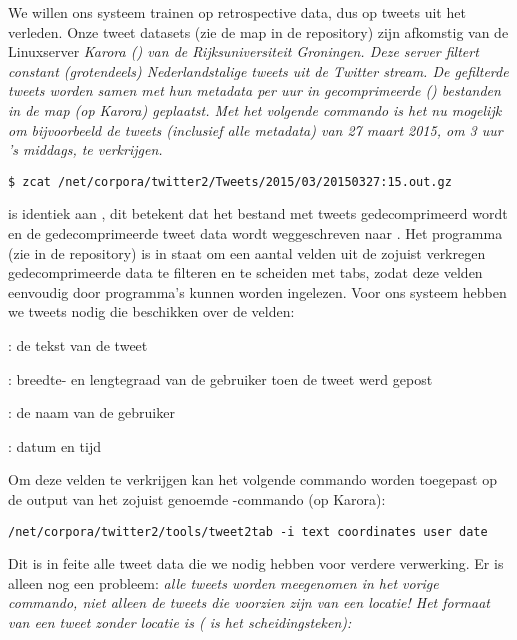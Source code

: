 {{We willen ons systeem trainen op retrospective data, dus op tweets uit het 
verleden. Onze tweet datasets (zie de map  in de repository) zijn afkomstig van de Linuxserver \it{Karora}
() van de Rijksuniversiteit Groningen. Deze server 
filtert constant 
(grotendeels) Nederlandstalige tweets uit de Twitter stream. De gefilterde 
tweets worden samen met hun metadata per uur in gecomprimeerde () 
bestanden in de map  (op Karora) geplaatst. 
Met het volgende commando is het nu mogelijk om bijvoorbeeld de tweets 
(inclusief alle 
metadata) van 27 maart 2015, om 3 uur 's middags, te verkrijgen.
\begin{lstlisting}
$ zcat /net/corpora/twitter2/Tweets/2015/03/20150327:15.out.gz
\end{lstlisting}
 is identiek aan , dit betekent dat het bestand met 
tweets gedecomprimeerd wordt en de gedecomprimeerde tweet data wordt weggeschreven 
naar .
\vl
Het programma  (zie  in de 
repository) is in 
staat om een aantal velden uit de zojuist verkregen gedecomprimeerde data te 
filteren en te scheiden met tabs, zodat deze velden eenvoudig door programma's
kunnen worden ingelezen. Voor ons systeem hebben we tweets nodig die beschikken 
over de velden:

\begin{bullets}
\item {}: de tekst van de tweet
\item {}: breedte- en lengtegraad van de gebruiker toen de tweet 
werd
gepost
\item {}: de naam van de gebruiker
\item {}: datum en tijd
\end{bullets}

Om deze velden te verkrijgen kan het volgende commando worden toegepast op de 
output van het zojuist genoemde -commando (op Karora):

\begin{lstlisting}
/net/corpora/twitter2/tools/tweet2tab -i text coordinates user date
\end{lstlisting}

Dit is in feite alle tweet data die we nodig hebben voor verdere verwerking. Er 
is alleen nog een probleem: \it{alle} tweets worden meegenomen in het vorige 
commando, niet alleen de tweets die voorzien zijn van een locatie! Het formaat 
van een tweet zonder locatie is ( is het scheidingsteken):

}}
